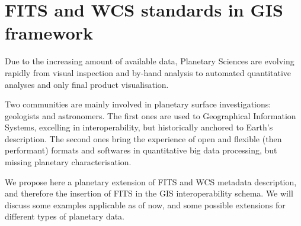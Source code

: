 \documentclass[11pt]{article}
\begin{document}
\section*{FITS and WCS standards in GIS framework}
Due to the increasing amount of available data, Planetary Sciences are evolving rapidly from visual inspection and by-hand analysis to automated
quantitative analyses and only final product visualisation.

Two communities are mainly involved in planetary surface investigations: geologists and astronomers.
The first ones are used to Geographical Information Systems, excelling in interoperability, but historically anchored to Earth's description.
The second ones bring the experience of open and flexible (then performant) formats and softwares in quantitative big data processing, but missing planetary
characterisation.

We propose here a planetary extension of FITS and WCS metadata description, and therefore the insertion of FITS in the GIS interoperability schema.
We will discuss some examples applicable as of now, and some possible extensions for different types of planetary data. 
\end{document}
